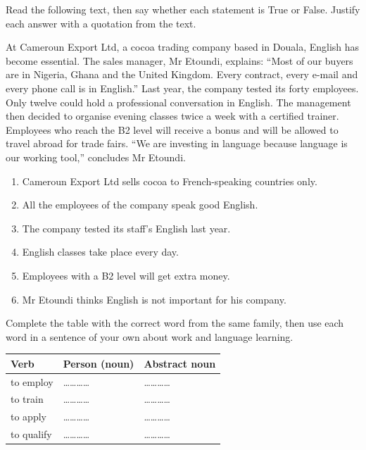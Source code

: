 \documentclass[11pt]{article}
\begin{document}
\begin{exercice}
Read the following text, then say whether each statement is True or False. Justify each answer with a quotation from the text.

\begin{textebox}
At Cameroun Export Ltd, a cocoa trading company based in Douala, English has become essential. The sales manager, Mr Etoundi, explains: “Most of our buyers are in Nigeria, Ghana and the United Kingdom. Every contract, every e-mail and every phone call is in English.” Last year, the company tested its forty employees. Only twelve could hold a professional conversation in English. The management then decided to organise evening classes twice a week with a certified trainer. Employees who reach the B2 level will receive a bonus and will be allowed to travel abroad for trade fairs. “We are investing in language because language is our working tool,” concludes Mr Etoundi.
\end{textebox}

\begin{enumerate}
\item Cameroun Export Ltd sells cocoa to French-speaking countries only.
\item All the employees of the company speak good English.
\item The company tested its staff's English last year.
\item English classes take place every day.
\item Employees with a B2 level will get extra money.
\item Mr Etoundi thinks English is not important for his company.
\end{enumerate}
\end{exercice}

\begin{exercice}
Complete the table with the correct word from the same family, then use each word in a sentence of your own about work and language learning.

\begin{center}
\begin{tabular}{|l|l|l|}
\hline
\rowcolor{popblueL} Verb & Person (noun) & Abstract noun \\
\hline
to employ & \ldots\ldots\ldots\ldots & \ldots\ldots\ldots\ldots \\
\hline
to train & \ldots\ldots\ldots\ldots & \ldots\ldots\ldots\ldots \\
\hline
to apply & \ldots\ldots\ldots\ldots & \ldots\ldots\ldots\ldots \\
\hline
to qualify & \ldots\ldots\ldots\ldots & \ldots\ldots\ldots\ldots \\
\hline
\end{tabular}
\end{center}
\end{exercice}
\end{document}
